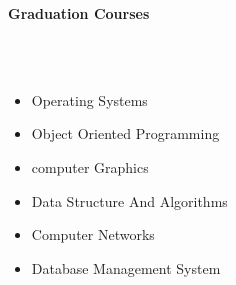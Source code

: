 \documentclass[a4paper,10pt]{article}
\newcommand{\lsep}{-0.5cm}
\newcommand{\resheading}[1]{{\small \colorbox{mygrey}{\begin{minipage}{0.975\textwidth}{\textbf{#1 \vphantom{p\^{E}}}}\end{minipage}}}}
\begin{document}
\resheading{\textbf{\large Graduation Courses }}\\[\lsep]\\[0.3cm]
	\noindent\begin{minipage}{.60\textwidth}
		\begin{itemize}
			\item Operating Systems\\[-0.6cm]
			\item Object Oriented Programming\\[-0.6cm]
			\item computer Graphics\\[-0.5cm]
			
			
		\end{itemize}
	\end{minipage} 
	\noindent\begin{minipage}{.40\textwidth}
		\begin{itemize}
			\item Data Structure And Algorithms\\[-0.6cm]
			\item Computer Networks\\[-0.6cm]
			\item Database Management System\\[-0.5cm]
					
		\end{itemize}
	\end{minipage}
\end{document}
